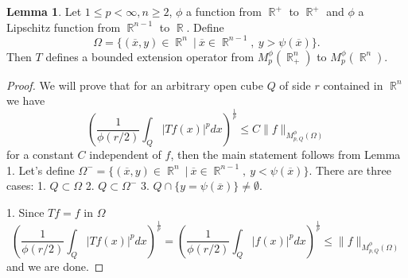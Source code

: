 \documentclass[12pt]{article}
\theoremstyle{definition}
\newtheorem{lemma}{Lemma}
\DeclareMathOperator\rr{\mathbb{R}}
\begin{document}
\begin{lemma}
Let $1\le p<\infty,n\ge2$, $\phi$ a function from $\rr^+$ to $\rr^+$ and $\phi$ a Lipschitz function from $\rr^{n-1}$ to $\rr$. Define 
\[\Omega = \{ (\overline x , y) \in \rr^n \ | \ \overline x \in \rr^{n-1}, \ y>\psi(\overline x) \} .\] 
Then $T$ defines a bounded extension operator from $M_p^\phi(\rr^n_+)$ to  $M_p^\phi(\rr^n)$.
\end{lemma}
\begin{proof}
We will prove that for an arbitrary open cube $Q$ of side $r$ contained in $\rr^n$ we have
\begin{equation}
\left(\frac{1}{\phi(r/2)}\int_Q |Tf(x)|^pdx \right)^{\frac{1}{p}} \le C \| f\|_{M_{p,Q}^\phi(\Omega)}
\end{equation}
for a constant $C$ independent of $f$, then the main statement follows from Lemma 1. Let's define  $\Omega^- = \{ (\overline x , y) \in \rr^n \ | \ \overline x \in \rr^{n-1}, \ y<\psi(\overline x) \}$. There are three cases: 1. $Q \subset \Omega$ 2. $Q \subset \Omega^-$ 3. $Q\cap \{y=\psi(\overline x)\} \neq \emptyset.$ 

1. Since $Tf=f$ in $\Omega$
\[ \left(\frac{1}{\phi(r/2)}\int_Q |Tf(x)|^pdx \right)^{\frac{1}{p}}=\left(\frac{1}{\phi(r/2)}\int_Q |f(x)|^pdx \right)^{\frac{1}{p}} \le  \| f\|_{M_{p,Q}^\phi(\Omega)}\]
and we are done.


\end{proof}
\end{document}
